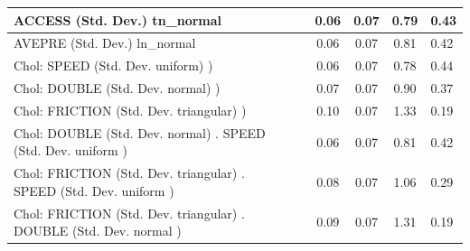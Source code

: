 \begin{table}
\begin{center}
\begin{tabular}{|l|l|c|c|c|l|}
			\hline
			ACCESS (Std. Dev.) tn_normal &  & 0.06 & 0.07 & 0.79 & 0.43 \\
			\hline
			AVEPRE (Std. Dev.) ln_normal &  & 0.06 & 0.07 & 0.81 & 0.42 \\
			\hline
			 Chol: SPEED (Std. Dev. uniform) ) &  & 0.06 & 0.07 & 0.78 & 0.44 \\
			\hline
			 Chol: DOUBLE (Std. Dev. normal) ) &  & 0.07 & 0.07 & 0.90 & 0.37 \\
			\hline
			 Chol: FRICTION (Std. Dev. triangular) ) &  & 0.10 & 0.07 & 1.33 & 0.19 \\
			\hline
			 Chol: DOUBLE (Std. Dev. normal) . SPEED (Std. Dev.   uniform ) &  & 0.06 & 0.07 & 0.81 & 0.42 \\
			\hline
			 Chol: FRICTION (Std. Dev. triangular) . SPEED (Std. Dev.   uniform ) &  & 0.08 & 0.07 & 1.06 & 0.29 \\
			\hline
			 Chol: FRICTION (Std. Dev. triangular) . DOUBLE (Std. Dev.   normal ) &  & 0.09 & 0.07 & 1.31 & 0.19 \\
			\hline
		\end{tabular}
	\end{center}
\end{table}